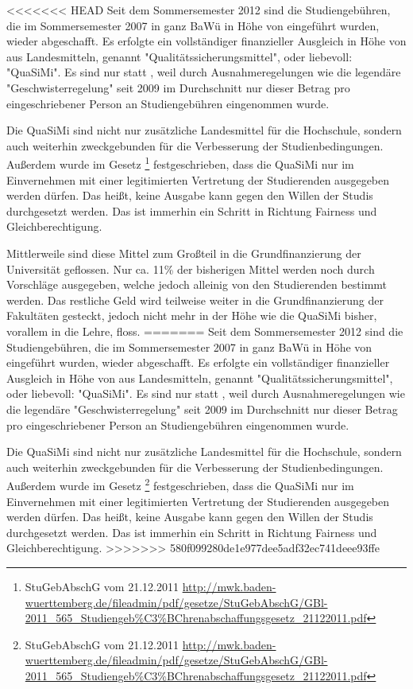 %

\newpage
{}%
<<<<<<< HEAD
Seit dem Sommersemester 2012 sind die Studiengebühren, die im Sommersemester
2007 in ganz BaWü in Höhe von  eingeführt wurden, wieder abgeschafft.
Es erfolgte ein vollständiger finanzieller Ausgleich in Höhe von  aus
Landesmitteln, genannt "Qualitätssicherungsmittel", oder liebevoll: "QuaSiMi".
Es sind nur  statt , weil durch Ausnahmeregelungen wie die
legendäre "Geschwisterregelung" seit 2009 im Durchschnitt nur dieser Betrag pro
eingeschriebener Person an Studiengebühren eingenommen wurde.

Die QuaSiMi sind nicht nur zusätzliche Landesmittel für die Hochschule, sondern
auch weiterhin zweckgebunden für die Verbesserung der Studienbedingungen.
Außerdem wurde im Gesetz \footnote{StuGebAbschG vom 21.12.2011
\url{http://mwk.baden-wuerttemberg.de/fileadmin/pdf/gesetze/StuGebAbschG/GBl-2011_565_Studiengeb\%C3\%BChrenabschaffungsgesetz_21122011.pdf}}
festgeschrieben, dass die QuaSiMi nur im Einvernehmen mit einer legitimierten
Vertretung der Studierenden ausgegeben werden dürfen. Das heißt, keine Ausgabe
kann gegen den Willen der Studis durchgesetzt werden. Das ist immerhin ein
Schritt in Richtung Fairness und Gleichberechtigung.

Mittlerweile sind diese Mittel zum Großteil in die Grundfinanzierung der
Universität geflossen. Nur ca. 11\% der bisherigen Mittel werden noch durch
Vorschläge ausgegeben, welche jedoch alleinig von den Studierenden bestimmt
werden. Das restliche Geld wird teilweise weiter in die Grundfinanzierung der
Fakultäten gesteckt, jedoch nicht mehr in der Höhe wie die QuaSiMi bisher,
vorallem in die Lehre, floss.
=======
Seit dem Sommersemester 2012 sind die Studiengebühren, die im Sommersemester 2007 in ganz BaWü in Höhe von  eingeführt wurden, wieder abgeschafft. Es erfolgte ein vollständiger finanzieller Ausgleich in Höhe von  aus Landesmitteln, genannt "Qualitätssicherungsmittel", oder liebevoll: "QuaSiMi". Es sind nur  statt , weil durch Ausnahmeregelungen wie die legendäre "Geschwisterregelung" seit 2009 im Durchschnitt nur dieser Betrag pro eingeschriebener Person an Studiengebühren eingenommen wurde.

Die QuaSiMi sind nicht nur zusätzliche Landesmittel für die Hochschule, sondern auch weiterhin zweckgebunden für die Verbesserung der Studienbedingungen. Außerdem wurde im Gesetz \footnote{StuGebAbschG vom 21.12.2011 \url{http://mwk.baden-wuerttemberg.de/fileadmin/pdf/gesetze/StuGebAbschG/GBl-2011_565_Studiengeb\%C3\%BChrenabschaffungsgesetz_21122011.pdf}} festgeschrieben, dass die QuaSiMi nur im Einvernehmen mit einer legitimierten Vertretung der Studierenden ausgegeben werden dürfen. Das heißt, keine Ausgabe kann gegen den Willen der Studis durchgesetzt werden. Das ist immerhin ein Schritt in Richtung Fairness und Gleichberechtigung.
>>>>>>> 580f099280de1e977dee5adf32ec741deee93ffe

